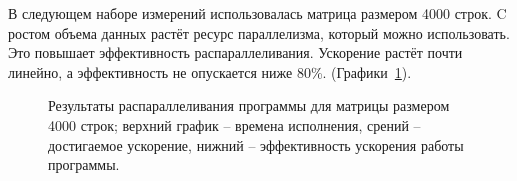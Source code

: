 \documentclass[12pt, oneside, a4paper]{article}
\begin{document}
В следующем наборе измерений использовалась матрица размером 4000 строк. C ростом объема данных растёт ресурс параллелизма, который можно использовать. Это повышает эффективность распараллеливания. Ускорение растёт почти линейно, а эффективность не опускается ниже 80\%. (Графики~\ref{fig:m4000}).

\begin{figure}[h!]
\caption{Результаты распараллеливания программы для матрицы размером 4000 строк; верхний график -- времена исполнения, срений -- достигаемое ускорение, нижний -- эффективность ускорения работы программы.}
\label{fig:m4000}
\end{figure}
\end{document}
